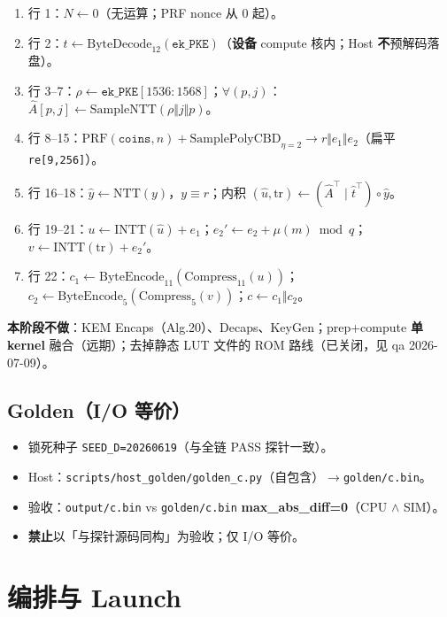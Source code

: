 \documentclass[UTF8,a4paper,11pt]{ctexart}
\begin{document}
\begin{enumerate}
  \item 行 1：$N\leftarrow 0$（无运算；PRF nonce 从 0 起）。
  \item 行 2：$\hat{t}\leftarrow\mathrm{ByteDecode}_{12}(\texttt{ek\_PKE})$（\textbf{设备} compute 核内；Host \textbf{不}预解码落盘）。
  \item 行 3--7：$\rho\leftarrow\texttt{ek\_PKE}[1536:1568]$；$\forall(p,j)$：$\hat{A}[p,j]\leftarrow\mathrm{SampleNTT}(\rho\Vert j\Vert p)$。
  \item 行 8--15：$\mathrm{PRF}(\texttt{coins},n)+\mathrm{SamplePolyCBD}_{\eta=2}\to r\Vert e_1\Vert e_2$（扁平 \texttt{re[9,256]}）。
  \item 行 16--18：$\hat{y}\leftarrow\mathrm{NTT}(y)$，$y\equiv r$；内积 $(\hat{u},\mathrm{tr})\leftarrow(\hat{A}^\top\mid\hat{t}^\top)\circ\hat{y}$。
  \item 行 19--21：$u\leftarrow\mathrm{INTT}(\hat{u})+e_1$；$e_2'\leftarrow e_2+\mu(m)\bmod q$；$v\leftarrow\mathrm{INTT}(\mathrm{tr})+e_2'$。
  \item 行 22：$c_1\leftarrow\mathrm{ByteEncode}_{11}(\mathrm{Compress}_{11}(u))$；$c_2\leftarrow\mathrm{ByteEncode}_{5}(\mathrm{Compress}_{5}(v))$；$c\leftarrow c_1\Vert c_2$。
\end{enumerate}

\textbf{本阶段不做}：KEM Encaps（Alg.20）、Decaps、KeyGen；prep+compute \textbf{单 kernel} 融合（远期）；去掉静态 LUT 文件的 ROM 路线（已关闭，见 qa 2026-07-09）。

\subsection{Golden（I/O 等价）}

\begin{itemize}
  \item 锁死种子 \texttt{SEED\_D=20260619}（与全链 PASS 探针一致）。
  \item Host：\texttt{scripts/host\_golden/golden\_c.py}（自包含）$\to$\texttt{golden/c.bin}。
  \item 验收：\texttt{output/c.bin} vs \texttt{golden/c.bin} \textbf{max\_abs\_diff=0}（CPU $\land$ SIM）。
  \item \textbf{禁止}以「与探针源码同构」为验收；仅 I/O 等价。
\end{itemize}

\section{编排与 Launch}
\label{sec:launch}
\end{document}
